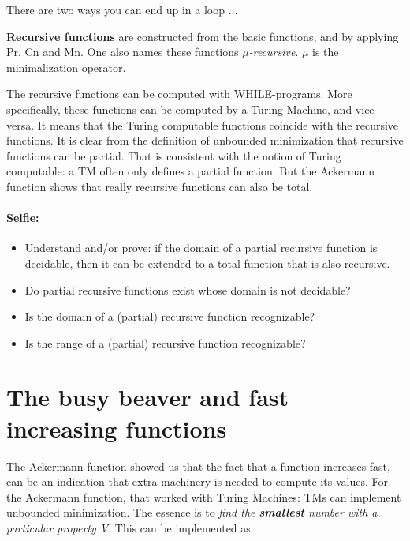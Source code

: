 There are two ways you can end up in a loop ...

\begin{definition}
{\bf Recursive functions} are constructed from the basic functions,
and by applying Pr, Cn and Mn. One also names these functions {\em
  $\mu$-recursive}. $\mu$ is the minimalization operator.
\end{definition}

The recursive functions can be computed with WHILE-programs. More
specifically, these functions can be computed by a Turing Machine, and
vice versa. It means that the Turing computable functions coincide with
the recursive functions. It is clear from the definition of unbounded
minimization that recursive functions can be partial. That is
consistent with the notion of Turing computable: a TM often only defines
a partial function. But the Ackermann function shows that really
recursive functions can also be total.


\paragraph{Selfie:}
\begin{itemize}
\item[]
Understand and/or prove: if the domain of a partial recursive function
is decidable, then it can be extended to a total function that is also
recursive.
\item[]
Do partial recursive functions exist whose domain is not decidable?
\item[]
Is the domain of a (partial) recursive function recognizable?
\item[]
Is the range of a (partial) recursive function recognizable?
\end{itemize}

\clearpage


\section{The busy beaver and fast increasing functions}

The Ackermann function showed us that the fact that a function
increases fast, can be an indication that extra machinery is needed to
compute its values. For the Ackermann function, that worked with
Turing Machines: TMs can implement unbounded minimization. The essence
is to {\em find the {\bf smallest} number with a particular property
  V}. This can be implemented as

